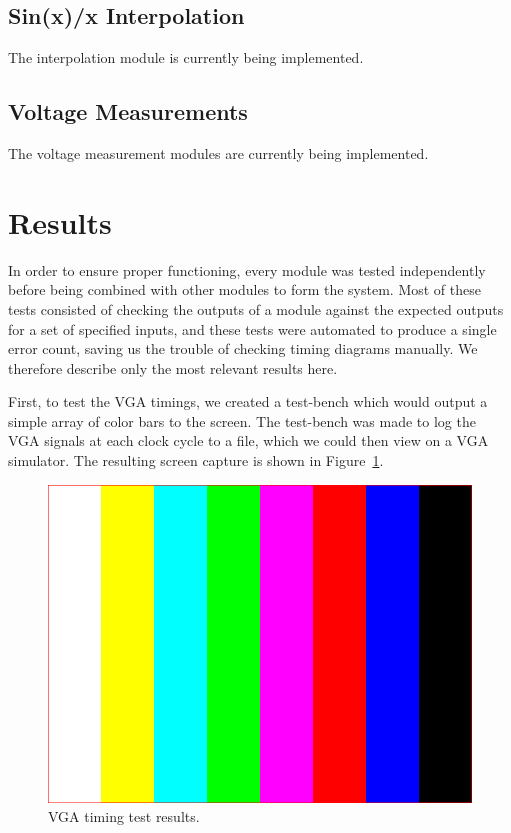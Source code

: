 \documentclass[journal]{IEEEtran}
\begin{document}
\subsection{Sin(x)/x Interpolation}

The interpolation module is currently being implemented.

\subsection{Voltage Measurements}

The voltage measurement modules are currently being implemented.

\section{Results}

In order to ensure proper functioning, every module was tested independently before being combined with other modules to form the system. Most of these tests consisted of checking the outputs of a module against the expected outputs for a set of specified inputs, and these tests were automated to produce a single error count, saving us the trouble of checking timing diagrams manually. We therefore describe only the most relevant results here.

First, to test the VGA timings, we created a test-bench which would output a simple array of color bars to the screen. The test-bench was made to log the VGA signals at each clock cycle to a file, which we could then view on a VGA simulator. The resulting screen capture is shown in Figure~\ref{fig:vga_timing_test}.

\begin{figure}[!htb]
  \centering
  \includegraphics[width=\columnwidth]{test-results/vga_timing.png}
  \caption{VGA timing test results.}
  \label{fig:vga_timing_test}
\end{figure}
\end{document}
